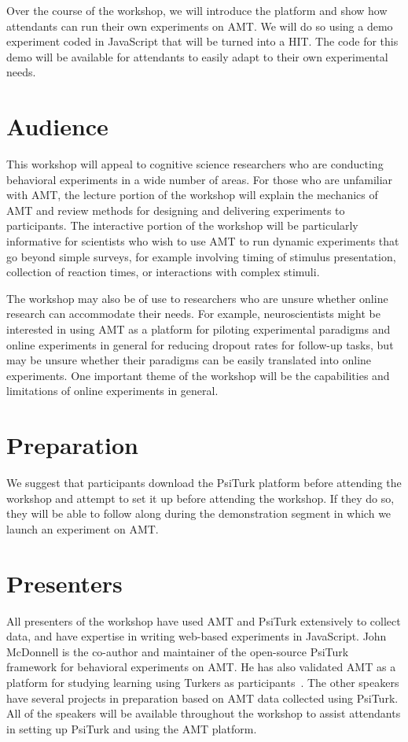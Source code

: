 \documentclass[10pt,letterpaper]{article}
\begin{document}
Over the course of the workshop, we will introduce the platform and show how
attendants can run their own experiments on {AMT}. We will do so using a demo
experiment coded in JavaScript that will be turned into a {HIT}. The code for this demo will
be available for attendants to easily adapt to their own experimental needs.

\section{Audience}
This workshop will appeal to cognitive science researchers who are conducting
behavioral experiments in a wide number of areas. For those who are unfamiliar
with AMT, the lecture portion of the workshop will explain the mechanics of AMT
and review methods for designing and delivering experiments to participants.  The
interactive portion of the workshop will be particularly informative for
scientists who wish to use AMT to run dynamic experiments that go beyond
simple surveys, for example involving timing of stimulus presentation, collection of reaction times, or interactions with complex stimuli.

The workshop may also be of use to researchers who are unsure whether online
research can accommodate their needs. For example, neuroscientists might be
interested in using AMT as a platform for piloting experimental paradigms and
online experiments in general for reducing dropout rates for follow-up tasks, but
may be unsure whether their paradigms can be easily translated into online
experiments. One important theme of the workshop will be the capabilities and
limitations of online experiments in general.

\section{Preparation}
We suggest that participants download the PsiTurk platform before attending the
workshop and attempt to set it up before attending the workshop. If they do so,
they will be able to follow along during the demonstration segment in which we launch an experiment on AMT.

\section{Presenters}
All presenters of the workshop have used AMT and PsiTurk extensively to collect data, and have expertise in writing web-based experiments in JavaScript.
John McDonnell is the co-author and maintainer of the open-source PsiTurk
framework for behavioral experiments on {AMT}. He has also validated AMT as a
platform for studying learning using Turkers as
participants~\cite{crump2013evaluating}. The other speakers have several projects
in preparation based on AMT data collected using PsiTurk.
All of the speakers will be available throughout the workshop to assist attendants in setting up PsiTurk and using the AMT platform.




\setlength{\bibleftmargin}{.125in}
\setlength{\bibindent}{-\bibleftmargin}



\todos
\end{document}
